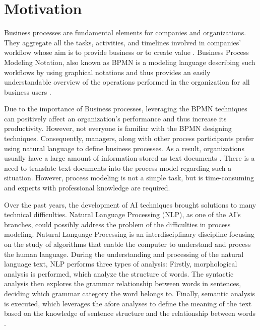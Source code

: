 \chapter{Motivation}
\label{sec:motivation}

	Business processes are fundamental elements for companies and organizations. They aggregate all the tasks, activities, and timelines involved in companies' workflow whose aim is to provide business or to create value \cite{literature_review_2}. Business Process Modeling Notation, also known as BPMN is a modeling language describing such workflows by using graphical notations and thus provides an easily understandable overview of the operations performed in the organization for all business users \cite{literature_review_1}. 
	
	Due to the importance of Business processes, leveraging the BPMN techniques can positively affect an organization's performance and thus increase its productivity. However, not everyone is familiar with the BPMN designing techniques. Consequently, managers, along with other process participants prefer using natural language to define business processes. As a result, organizations usually have a large amount of information stored as text documents \cite{literature_review_2}. There is a need to translate text documents into the process model regarding such a situation. However, process modeling is not a simple task, but is time-consuming and experts with professional knowledge are required. 
	
	Over the past years, the development of AI techniques brought solutions to many technical difficulties. Natural Language Processing (NLP), as one of the AI's branches, could possibly address the problem of the difficulties in process modeling. Natural Language Processing is an interdisciplinary discipline focusing on the study of algorithms that enable the computer to understand and process the human language\cite{main_1}. During the understanding and processing of the natural language text, NLP performs three types of analysis: Firstly, morphological analysis is performed, which analyze the structure of words. The syntactic analysis then explores the grammar relationship between words in sentences, deciding which grammar category the word belongs to. Finally, semantic analysis is executed, which leverages the afore analyses to define the meaning of the text based on the knowledge of sentence structure and the relationship between words \cite{literature_review_2}. 
	
